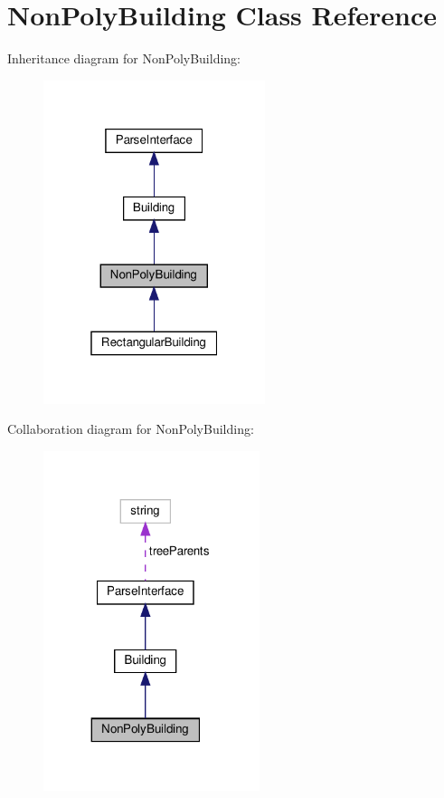 \hypertarget{classNonPolyBuilding}{}\section{Non\+Poly\+Building Class Reference}
\label{classNonPolyBuilding}


Inheritance diagram for Non\+Poly\+Building\+:
\nopagebreak
\begin{figure}[H]
\begin{center}
\leavevmode
\includegraphics[width=184pt]{classNonPolyBuilding__inherit__graph}
\end{center}
\end{figure}


Collaboration diagram for Non\+Poly\+Building\+:
\nopagebreak
\begin{figure}[H]
\begin{center}
\leavevmode
\includegraphics[width=179pt]{classNonPolyBuilding__coll__graph}
\end{center}
\end{figure}
